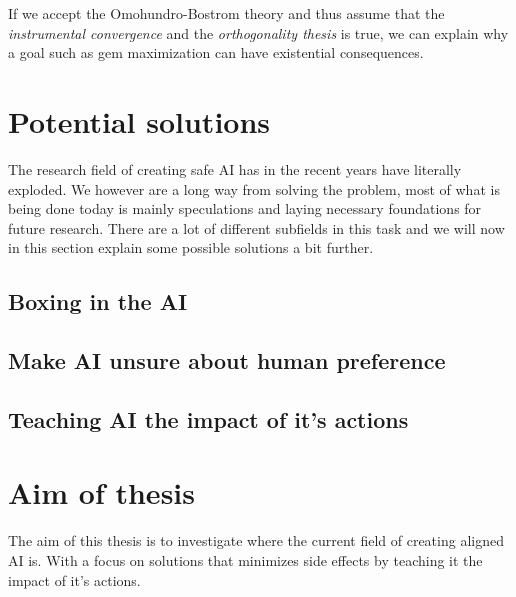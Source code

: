 \documentclass[12pt,A4]{report}
\theoremstyle{definition}
\begin{document}
If we accept the Omohundro-Bostrom theory and thus assume that the \textit{instrumental convergence} and the \textit{orthogonality thesis} is true, we can explain why a goal such as gem maximization can have existential consequences. 

\section{Potential solutions}
The research field of creating safe AI has in the recent years have literally exploded. We however are a long way from solving the problem, most of what is being done today is mainly speculations and laying necessary foundations for future research. There are a lot of different subfields in this task and we will now in this section explain some possible solutions a bit further.

\subsection{Boxing in the AI}

\subsection{Make AI unsure about human preference}

\subsection{Teaching AI the impact of it's actions}

\section{Aim of thesis}
The aim of this thesis is to investigate where the current field of creating aligned AI is. With a focus on solutions that minimizes side effects by teaching it the impact of it's actions.





\end{document}
